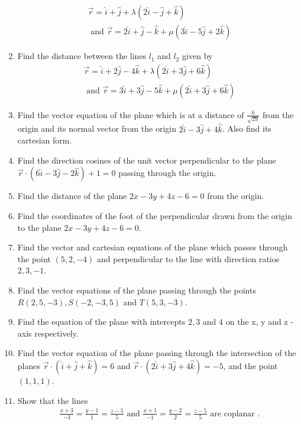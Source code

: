 \documentclass{article}
\theoremstyle{remark}
\begin{document}
\begin{enumerate}
\begin{align}
\overrightarrow{r}= \hat{i}+ \hat{j}+ \lambda(2 \hat{i}- \hat{j}+ \hat{k}) \\
\text{ and } \overrightarrow{r}= 2 \hat{i}+ \hat{j}- \hat{k}+ \mu(3 \hat{i}- 5 \hat{j}+ 2 \hat{k}) 
\end{align}
\item Find the distance between the lines $l_1$ and $l_2$ given by
\begin{align}
\overrightarrow{r}= \hat{i}+ 2 \hat{j}- 4 \hat{k}+ \lambda(2 \hat{i}+ 3 \hat{j}+ 6 \hat{k}) \\
\text{ and }\overrightarrow{r}= 3 \hat{i}+ 3 \hat{j}- 5 \hat{k}+ \mu(2 \hat{i}+ 3 \hat{j}+ 6 \hat{k}) 
\end{align}
\item Find the vector equation of the plane which is at a distance of $\frac{6}{\sqrt{29}}$ from the origin and its normal vector from the origin $2 \hat{i}- 3 \hat{j}+ 4 \hat{k}$. Also find its cartesian form.
\item Find the direction cosines of the unit vector perpendicular to the plane $\overrightarrow{r} \cdot(6 \hat{i}- 3 \hat{j}- 2 \hat{k})+ 1= 0$ passing through the origin.
\item Find the distance of the plane $2x- 3y+ 4z- 6= 0$ from the origin.
\item Find the coordinates of the foot of the perpendicular drawn from the origin to the plane $2x -3y +4z -6 = 0$.
\item Find the vector and cartesian equations of the plane which passes through the point $(5, 2, -4)$ and perpendicular to the line with direction ratios $2, 3, -1$.
\item Find the vector equations of the plane passing through the points $R(2, 5, -3), S(-2, -3, 5)$ and $T(5, 3, -3)$.
\item Find the equation of the plane with intercepts $2, 3$ and $4$ on the x, y and z - axis respectively.
\item Find the vector equation of the plane passing through the intersection of the planes $\overrightarrow{r} \cdot (\hat{i} +\hat{j} +\hat{k})=6$ and $\overrightarrow{r} \cdot (2\hat{i} +3\hat{j} +4\hat{k})=-5$, and the point $(1, 1, 1)$.
\item Show that the lines 
\begin{align}
\frac{x+3}{-3}= \frac{y-1}{1}= \frac{z-5}{5} \text{ and } \frac{x+1}{-1} =\frac{y-2}{2} =\frac{z-5}{5} \text{ are coplanar }.
\end{align}

\end{enumerate}
\end{document}
